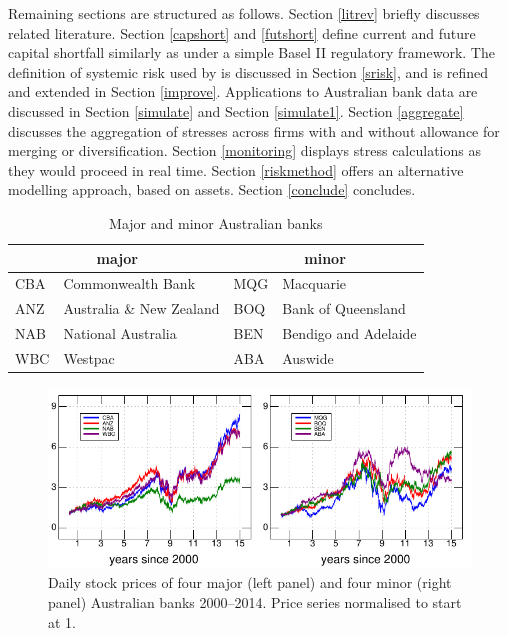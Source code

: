 \documentclass[12pt]{article}
\newcommand{\sref}[1]{Section \ref{#1}}
\begin{document}
Remaining sections are structured as follows. Section \ref{litrev} briefly discusses related literature. Section \ref{capshort} and \ref{futshort} define current and future  capital shortfall similarly as \cite{brownlees2015} under a simple Basel II regulatory framework. The definition of systemic risk used by \cite{brownlees2015} is discussed in \sref{srisk}, and is refined and extended in \sref{improve}. Applications to Australian bank data are discussed in \sref{simulate} and \sref{simulate1}. Section \ref{aggregate}  discusses the aggregation of  stresses across firms with and without allowance for merging or diversification. Section \ref{monitoring} displays stress calculations as they would proceed in real time.   Section \ref{riskmethod} offers an alternative modelling approach, based on assets.  Section \ref{conclude} concludes.

\begin{table}[htbp]
\label{banks}\caption{Major and minor Australian banks}\label{eightbanks}
\begin{center}
\begin{tabular}{l|l|l|l}
\hline
 \multicolumn{2}{c|}{major}& \multicolumn{2}{c}{minor}\\
 \hline
CBA & Commonwealth Bank  & MQG & Macquarie \\
ANZ & Australia \& New Zealand  & BOQ & Bank of Queensland\\
NAB & National Australia  & BEN & Bendigo and Adelaide \\
WBC & Westpac & ABA& Auswide \\
\hline
\end{tabular}
\end{center}
\end{table}%


\begin{figure}[htbp]
\label{prices}
\begin{center}
\includegraphics[width=16cm]{figures/prices.pdf}
\caption{Daily stock  prices of four major (left panel) and four minor (right panel) Australian banks 2000--2014.  Price series normalised to start at 1.}
\end{center}
\end{figure}
\end{document}
